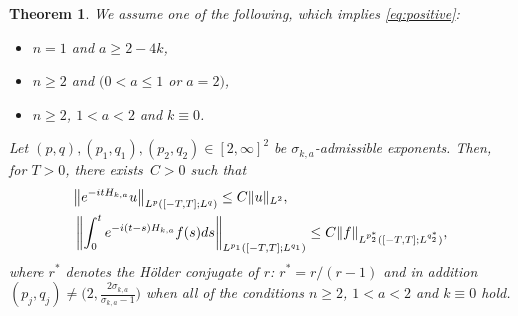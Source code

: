 \documentclass[10pt,a4paper]{article}
\numberwithin{equation}{section}
\newtheorem{Theorem}{Theorem}[section]
\def\s{\sigma}
\begin{document}
\begin{Theorem}\label{mainthmSt}
We assume one of the following, which implies \eqref{eq:positive}:
\begin{itemize}\itemsep=0pt
\item $n=1$ and $a\ge 2-4k$,
\item $n\ge 2$ and $(0<a\le 1$ or $a=2)$,
\item $n\ge 2$, $1<a<2$ and $k\equiv 0$.
\end{itemize}
Let $(p,q), (p_1,q_1), (p_2,q_2)\in [2,\infty]^2$ be $\sigma_{k,a}$-admissible exponents.
Then, for $T>0$, there exists~${C>0}$ such that
\begin{align}
&\big\|{\rm e}^{-{\rm i}tH_{k,a}}u\big\|_{L^p([-T,T]; L^q)}\leq C\|u\|_{L^2}\label{homStr},\\
&\left\|\int_{0}^t{\rm e}^{-{\rm i}(t-s)H_{k,a}}f(s)ds \right\|_{L^{p_1}([-T,T]; L^{q_1})} \leq C\|f\|_{L^{p_2^*}([-T,T]; L^{q_2^*})},\label{inhomStr}
\end{align}
where $r^*$ denotes the H\"older conjugate of $r$: $r^*=r/(r-1)$ and in addition $(p_j,q_j)\neq \bigl(2,\frac{2\s_{k,a}}{\s_{k,a}-1}\bigr)$ when all of the conditions $n\geq 2$, $1<a<2$ and $k\equiv 0$ hold.
\end{Theorem}
\end{document}

